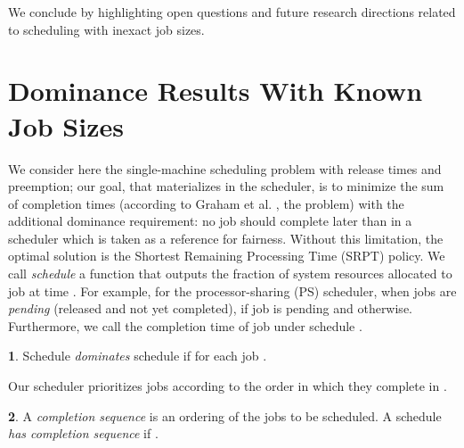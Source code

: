 \documentclass[11pt,oneside,english]{amsart}
\numberwithin{equation}{section}
\numberwithin{figure}{section}
\theoremstyle{definition}
\newtheorem{defn}{\protect\definitionname}
\theoremstyle{plain}
\providecommand{\definitionname}{Definition}
\begin{document}
We conclude by highlighting open questions and future research directions 
related to scheduling with inexact job sizes.



\section{\label{sec:Analytical-Results}Dominance Results With Known Job Sizes}

We consider here the single-machine scheduling problem with release
times and preemption; our goal, that materializes in the  scheduler, is to minimize the sum of 
completion times (according to Graham et al. \cite{
Graham1979}, the  problem) with the 
additional dominance requirement: no job should complete later than 
in a scheduler which is taken as a reference for fairness. Without 
this limitation, the optimal solution is the Shortest Remaining 
Processing Time (SRPT) policy. We call \emph{
schedule }a function 
that outputs the fraction of system resources allocated to job 
at time . For example, for the processor-sharing (PS) scheduler,
when  jobs are \emph{pending }(released and not yet completed),
 if job  is pending and 
otherwise. Furthermore, we call  the completion time
of job  under schedule .
\begin{defn}
Schedule  \emph{dominates} schedule  if 
for each job .
\end{defn}
Our scheduler prioritizes jobs according to the order in which they
complete in .
\begin{defn}
A \emph{completion sequence  }is
an ordering of the jobs to be scheduled. A schedule  \emph{has
completion sequence}  if .
\end{defn}
\end{document}
